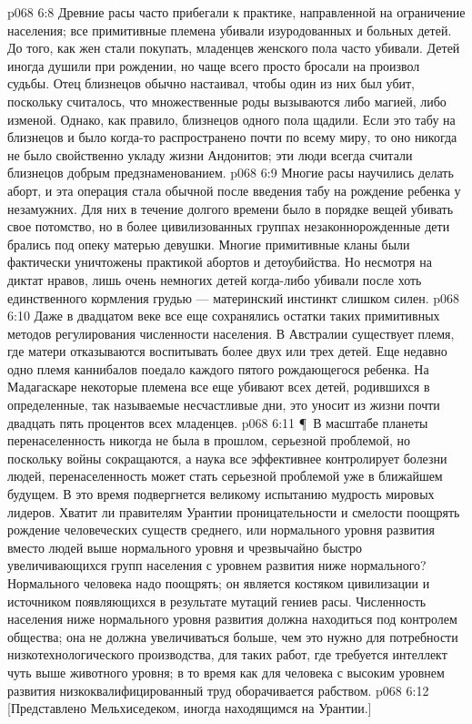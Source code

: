 \vs p068 6:8 Древние расы часто прибегали к практике, направленной на ограничение населения; все примитивные племена убивали изуродованных и больных детей. До того, как жен стали покупать, младенцев женского пола часто убивали. Детей иногда душили при рождении, но чаще всего просто бросали на произвол судьбы. Отец близнецов обычно настаивал, чтобы один из них был убит, поскольку считалось, что множественные роды вызываются либо магией, либо изменой. Однако, как правило, близнецов одного пола щадили. Если это табу на близнецов и было когда\hyp{}то распространено почти по всему миру, то оно никогда не было свойственно укладу жизни Андонитов; эти люди всегда считали близнецов добрым предзнаменованием.
\vs p068 6:9 Многие расы научились делать аборт, и эта операция стала обычной после введения табу на рождение ребенка у незамужних. Для них в течение долгого времени было в порядке вещей убивать свое потомство, но в более цивилизованных группах незаконнорожденные дети брались под опеку матерью девушки. Многие примитивные кланы были фактически уничтожены практикой абортов и детоубийства. Но несмотря на диктат нравов, лишь очень немногих детей когда\hyp{}либо убивали после хоть единственного кормления грудью --- материнский инстинкт слишком силен.
\vs p068 6:10 Даже в двадцатом веке все еще сохранялись остатки таких примитивных методов регулирования численности населения. В Австралии существует племя, где матери отказываются воспитывать более двух или трех детей. Еще недавно одно племя каннибалов поедало каждого пятого рождающегося ребенка. На Мадагаскаре некоторые племена все еще убивают всех детей, родившихся в определенные, так называемые несчастливые дни, это уносит из жизни почти двадцать пять процентов всех младенцев.
\vs p068 6:11 \P\ В масштабе планеты перенаселенность никогда не была в прошлом, серьезной проблемой, но поскольку войны сокращаются, а наука все эффективнее контролирует болезни людей, перенаселенность может стать серьезной проблемой уже в ближайшем будущем. В это время подвергнется великому испытанию мудрость мировых лидеров. Хватит ли правителям Урантии проницательности и смелости поощрять рождение человеческих существ среднего, или нормального уровня развития вместо людей выше нормального уровня и чрезвычайно быстро увеличивающихся групп населения с уровнем развития ниже нормального? Нормального человека надо поощрять; он является костяком цивилизации и источником появляющихся в результате мутаций гениев расы. Численность населения ниже нормального уровня развития должна находиться под контролем общества; она не должна увеличиваться больше, чем это нужно для потребности низкотехнологического производства, для таких работ, где требуется интеллект чуть выше животного уровня; в то время как для человека с высоким уровнем развития низкоквалифицированный труд оборачивается рабством.
\vs p068 6:12 [Представлено Мельхиседеком, иногда находящимся на Урантии.]
